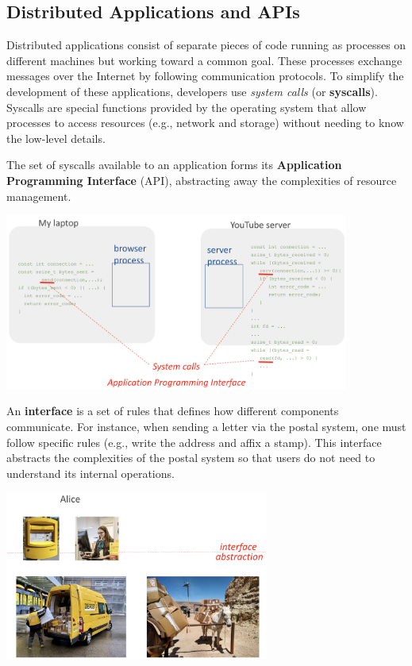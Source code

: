 \documentclass[../../compsys.tex]{subfiles}
\begin{document}
\subsection{Distributed Applications and APIs}

Distributed applications consist of separate pieces of code running as processes on different machines but working toward a common goal. These processes exchange messages over the Internet by following communication protocols.  
To simplify the development of these applications, developers use \emph{system calls} (or \textbf{syscalls}). Syscalls are special functions provided by the operating system that allow processes to access resources (e.g., network and storage) without needing to know the low-level details.

The set of syscalls available to an application forms its \textbf{Application Programming Interface} (API), abstracting away the complexities of resource management.

\begin{center}
  \includegraphics[width=0.85\textwidth]{chapters/L1/images/api.png}
\end{center}

\vfill
\begin{definition}[Interface]
An \textbf{interface} is a set of rules that defines how different components communicate. For instance, when sending a letter via the postal system, one must follow specific rules (e.g., write the address and affix a stamp). This interface abstracts the complexities of the postal system so that users do not need to understand its internal operations.
\end{definition}

\begin{center}
  \includegraphics[width=0.65\textwidth]{chapters/L1/images/postal.png}
\end{center}
\vfill
\end{document}

